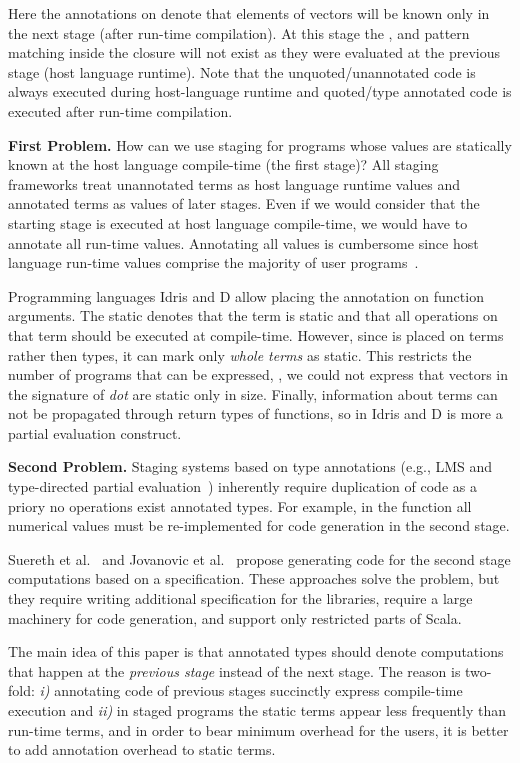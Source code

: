 Here the  annotations on  denote that elements of vectors will be known
 only in the next stage (after run-time compilation). At this stage the 
 , and pattern matching inside the closure will not exist
 as they were evaluated at the previous stage (host language runtime). Note that
 the unquoted/unannotated code is always executed during host-language runtime
 and quoted/type annotated code is executed after run-time compilation.


{\bf First Problem.} How can we use staging for programs whose values are statically
 known at the host language compile-time (the first stage)? All staging frameworks treat unannotated
 terms as host language runtime values and annotated terms as values of later stages.
 Even if we would consider that the starting stage is executed at host language compile-time, we would
 have to annotate all run-time values. Annotating all values is cumbersome since host
 language run-time values comprise the majority of user programs~.

Programming languages Idris and D allow placing the  annotation on
 function arguments. The static denotes that the term is static and that all operations
 on that term should be executed at compile-time. However, since  is
 placed on terms rather then types, it can mark only \emph{whole terms} as static.
 This restricts the number of programs that can be expressed, \eg, we could not
 express that vectors in the signature of \emph{dot} are static only in size. Finally,
 information about  terms can not be propagated through return types of functions,
 so  in Idris and D is more a partial evaluation construct.

{\bf Second Problem.} Staging systems based on type annotations (e.g., LMS and type-directed
partial evaluation~\cite{danvy1999type}) inherently require duplication of code as
a priory no operations exist  annotated types. For example, in the 
function all numerical values must be re-implemented for code generation in the
second stage.

Suereth et al.~\cite{forge} and Jovanovic et al.~\cite{yin-yang}
 propose generating code for the second stage computations based on
 a specification. These approaches solve the problem,
 but they require writing additional specification for the libraries,
 require a large machinery for code generation,
 and support only restricted parts of Scala.

The main idea of this paper is that annotated types should denote computations
 that happen at the \emph{previous stage} instead of the next stage.
 The reason is two-fold: \emph{i)} annotating code of previous stages succinctly
 express compile-time execution and \emph{ii)} in staged programs the static terms
 appear less frequently than run-time terms, and in order to bear minimum overhead
 for the users, it is better to add annotation overhead to static terms.

